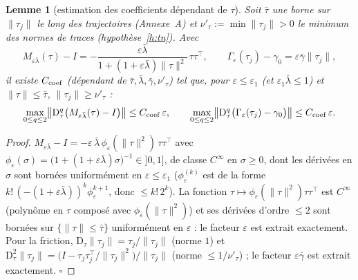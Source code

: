 \documentclass[11pt,a4paper]{article}
\newtheorem{lemme}[theoreme]{Lemme}
\theoremstyle{remark}
\theoremstyle{definition}
\newcommand{\norm}[1]{\lVert #1\rVert}
\newcommand{\eps}{\varepsilon}
\newcommand{\D}{\mathrm D}
\begin{document}
\begin{lemme}[estimation des coefficients dépendant de $\tau$]\label{lem:coef}
Soit $\bar\tau$ une borne sur $\norm{\tau_j}$ le long des trajectoires (Annexe~A) et $\nu'_\tau:=\min\norm{\tau_j}>0$ le minimum des normes de traces (hypothèse~\ref{h:tn}). Avec
\[
M_{\eps\bar\lambda}(\tau)-I=-\frac{\eps\bar\lambda}{1+(1+\eps\bar\lambda)\norm\tau^2}\,\tau\tau^\top,\qquad
\Gamma_\eps(\tau_j)-\gamma_0=\eps\bar\gamma\norm{\tau_j},
\]
il existe $C_{\rm coef}$ (dépendant de $\bar\tau,\bar\lambda,\bar\gamma,\nu'_\tau$) tel que, pour $\eps\le\eps_1$ (et $\eps_1\bar\lambda\le1$) et $\norm{\tau}\le\bar\tau$, $\norm{\tau_j}\ge\nu'_\tau$ :
\[
\max_{0\le q\le2}\bigl\lVert\D_\tau^q\bigl(M_{\eps\bar\lambda}(\tau)-I\bigr)\bigr\rVert\le C_{\rm coef}\,\eps,\qquad
\max_{0\le q\le2}\bigl\lVert\D_\tau^q\bigl(\Gamma_\eps(\tau_j)-\gamma_0\bigr)\bigr\rVert\le C_{\rm coef}\,\eps .
\]
\end{lemme}
\begin{proof}
$M_{\eps\bar\lambda}-I=-\eps\,\bar\lambda\,\phi_\eps(\norm\tau^2)\,\tau\tau^\top$ avec $\phi_\eps(\sigma)=\bigl(1+(1+\eps\bar\lambda)\sigma\bigr)^{-1}\in]0,1]$, de classe $C^\infty$ en $\sigma\ge0$, dont les dérivées en $\sigma$ sont bornées uniformément en $\eps\le\eps_1$ ($\phi_\eps^{(k)}$ est de la forme $k!\,(-(1+\eps\bar\lambda))^k\phi_\eps^{k+1}$, donc $\le k!\,2^k$). La fonction $\tau\mapsto\phi_\eps(\norm\tau^2)\tau\tau^\top$ est $C^\infty$ (polynôme en $\tau$ composé avec $\phi_\eps(\norm\tau^2)$) et ses dérivées d'ordre $\le2$ sont bornées sur $\{\norm\tau\le\bar\tau\}$ uniformément en $\eps$ : le facteur $\eps$ est extrait exactement. Pour la friction, $\D_\tau\norm{\tau_j}=\tau_j/\norm{\tau_j}$ (norme $1$) et $\D_\tau^2\norm{\tau_j}=\bigl(I-\tau_j\tau_j^\top/\norm{\tau_j}^2\bigr)/\norm{\tau_j}$ (norme $\le1/\nu'_\tau$) ; le facteur $\eps\bar\gamma$ est extrait exactement. $\square$
\end{proof}
\end{document}
